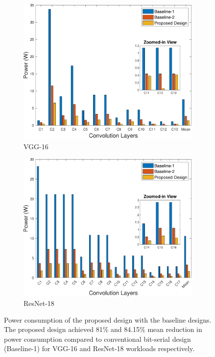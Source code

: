 \documentclass[conference]{IEEEtran}
\begin{document}
\begin{figure}
     \centering
     \begin{subfigure}[b]{\linewidth}
         \centering
         \includegraphics[width=\linewidth]{VGG_power.pdf}
         \caption{VGG-16}
         \label{fig:power_VGG}
     \end{subfigure}
     \hfill
     \begin{subfigure}[b]{\linewidth}
         \centering
         \includegraphics[width=\linewidth]{ResNet_power.pdf}
         \caption{ResNet-18}
         \label{fig:power_ResNet}
     \end{subfigure}
     \caption{Power consumption of the proposed design with the baseline designs. The proposed design achieved 81\% and 84.15\% mean reduction in power consumption compared to conventional bit-serial design (Baseline-1) for VGG-16 and ResNet-18 workloads respectively.}
     \label{fig:power_consumption}
\end{figure}
\end{document}
